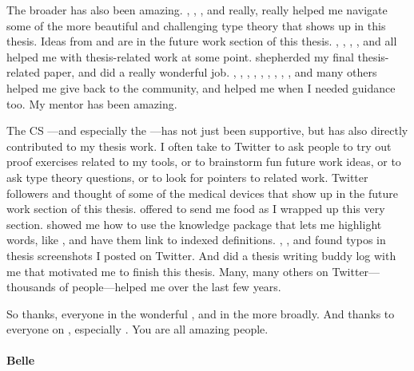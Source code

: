 The broader  has also been amazing.
, , , and  really, really helped me navigate
some of the more beautiful and challenging type theory that shows up in this thesis.
Ideas from  and  are in the future work section of this thesis.
, , , , and  all helped me with
thesis-related work at some point.
 shepherded my final thesis-related paper, and did a really wonderful job.
, , , ,
, , , , , and many others helped me give back to the community,
and helped me when I needed guidance too.
My mentor  has been amazing.

The CS ---and especially the ---has not just been supportive,
but has also directly contributed to my thesis work.
I often take to Twitter to ask people to try out proof exercises related to my tools,
or to brainstorm fun future work ideas,
or to ask type theory questions,
or to look for pointers to related work.
Twitter followers  and  thought of some of the medical devices
that show up in the future work section of this thesis.
 offered to send me food as I wrapped up this very section.
 showed me how to use the knowledge package that lets
me highlight words, like , and have them link to indexed definitions.
, , and  found typos in thesis screenshots I posted on Twitter.
And  did a thesis writing buddy log with me that motivated me to finish this thesis.
Many, many others on Twitter---thousands of people---helped me over the last few years.

So thanks, everyone in the wonderful , and in the  more broadly.
And thanks to everyone on , especially .
You are all amazing people.

\paragraph{Belle}

